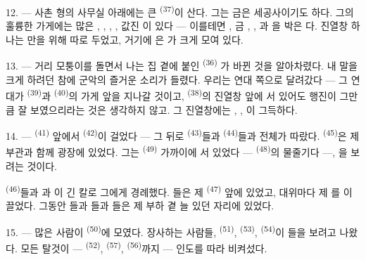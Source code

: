 12. --- 사촌 형의 사무실 아래에는 큰  \textsuperscript{(37)}이
산다. 그는 금은 세공사이기도 하다. 그의 훌륭한 가게에는 많은 ,
, , , 값진 이 있다 —
이를테면 , 금 , , 과
을 박은 다. 진열창 하나는 만을 위해 따로
두었고, 거기에 은 가 크게 모여 있다.

13. --- 거리 모퉁이를 돌면서 나는 집  곁에 붙인  \textsuperscript{(36)}
가 바뀐 것을 알아차렸다. 내 말을 크게 하려던 참에 군악의 즐거운 소리가 들렸다. 우리는
연대 쪽으로 달려갔다 — 그 연대가  \textsuperscript{(39)}과
 \textsuperscript{(40)}의 가게 앞을 지나갈 것이고, 
\textsuperscript{(38)}의 진열창 앞에 서 있어도 행진이 그만큼 잘 보였으리라는 것은
생각하지 않고. 그 진열창에는 , ,
이 그득하다.

\VUsaut{3.0mm}

14. ---  \textsuperscript{(41)} 앞에서  \textsuperscript{(42)}이
걸었다 — 그 뒤로  \textsuperscript{(43)}들과 
\textsuperscript{(44)}들과  전체가 따랐다.  \textsuperscript{(45)}은
제 부관과 함께 광장에 있었다. 그는  \textsuperscript{(49)} 가까이에 서 있었다
—  \textsuperscript{(48)}의 물줄기다 —, 을 보려는 것이다.

 \textsuperscript{(46)}들과 과 이 긴 칼로 그에게
경례했다. 들은 제  \textsuperscript{(47)} 앞에 있었고, 대위마다
제 를 이끌었다. 그동안 들과 들과
들은 제 부하 곁 늘 있던 자리에 있었다.

15. --- 많은 사람이  \textsuperscript{(50)}에 모였다. 장사하는 사람들,
 \textsuperscript{(51)},  \textsuperscript{(53)},
 \textsuperscript{(54)}이 들을 보려고 나왔다. 모든 탈것이 —
 \textsuperscript{(52)},  \textsuperscript{(57)},
 \textsuperscript{(56)}까지 — 인도를 따라 비켜섰다.

\VUsaut{3.0mm}

